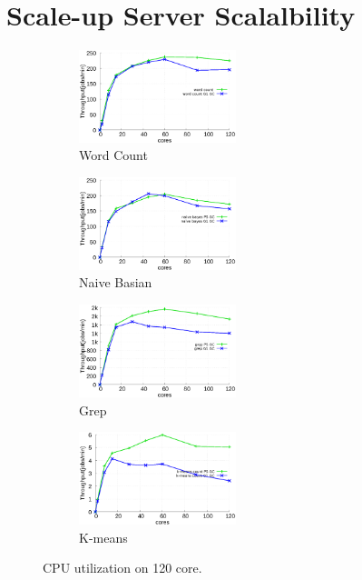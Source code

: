 \section{Scale-up Server Scalalbility}


\begin{figure}[tb]
    \centering
    \begin{subfigure}[b]{0.25\textwidth}
        \includegraphics[width=1.8in]{graph/wc.eps}
        \caption{Word Count}
    \end{subfigure}%
    \begin{subfigure}[b]{0.25\textwidth}
        \includegraphics[width=1.8in]{graph/nb.eps}
        \caption{Naive Basian}
    \end{subfigure}%
    \begin{subfigure}[b]{0.25\textwidth}
        \includegraphics[width=1.8in]{graph/grep.eps}
        \caption{Grep}
    \end{subfigure}%
    \begin{subfigure}[b]{0.25\textwidth}
        \includegraphics[width=1.8in]{graph/kmeans.eps}
        \caption{K-means}
    \end{subfigure}%
    \caption{CPU utilization on 120 core.}
    \label{fig:utilization}
\end{figure}



